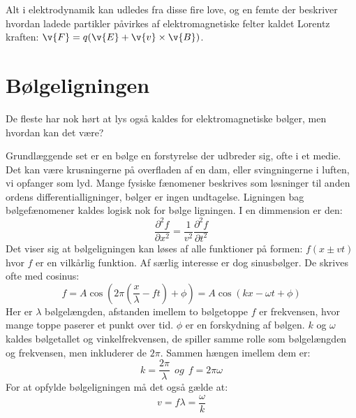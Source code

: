 Alt i elektrodynamik kan udledes fra disse fire love, og en femte der beskriver hvordan ladede partikler påvirkes af elektromagnetiske felter kaldet Lorentz kraften: $\v{F} = q(\v{E}+\v{v}\times\v{B})$.
\section{Bølgeligningen}
De fleste har nok hørt at lys også kaldes for elektromagnetiske bølger, men hvordan kan det være? 

Grundlæggende set er en bølge en forstyrelse der udbreder sig, ofte i et medie. Det kan være krusningerne på overfladen af en dam, eller svingningerne i luften, vi opfanger som lyd. Mange fysiske fænomener beskrives som løsninger til anden ordens differentialligninger, bølger er ingen undtagelse. Ligningen bag bølgefænomener kaldes logisk nok for bølge ligningen. I en dimmension er den:
$$
\frac{\partial^2 f}{\partial x^2} = \frac{1}{v^2}\frac{\partial^2 f}{\partial t^2}
$$
Det viser sig at bølgeligningen kan løses af alle funktioner på formen: $f(x\pm vt)$ hvor $f$ er en vilkårlig funktion. Af særlig interesse er dog sinusbølger. De skrives ofte med cosinus:
$$
f = A\cos\left(2\pi\left(\frac{x}{\lambda} - ft\right)+\phi\right) = A\cos\left( kx-\omega t+\phi\right)
$$
Her er $\lambda$ bølgelængden, afstanden imellem to bølgetoppe $f$ er frekvensen, hvor mange toppe paserer et punkt over tid. $\phi$ er en forskydning af bølgen. $k$ og $\omega$ kaldes bølgetallet og vinkelfrekvensen, de spiller samme rolle som bølgelængden og frekvensen, men inkluderer de $2\pi$. Sammen hængen imellem dem er: $$k=\frac{2\pi}{\lambda}~~ og ~~f = 2\pi\omega$$ For at opfylde bølgeligningen må det også gælde at:
$$
v = f\lambda = \frac{\omega}{k}
$$
